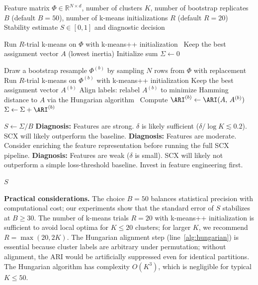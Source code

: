 \begin{algorithm}[t]
\caption{Bootstrap ARI Stability Diagnostic for Feature Strength}
\label{alg:bootstrap_stability}
\begin{algorithmic}[1]
\Require Feature matrix $\Phi \in \mathbb{R}^{N \times d}$, number of clusters $K$, number of bootstrap replicates $B$ (default $B = 50$), number of k-means initializations $R$ (default $R = 20$)
\Ensure Stability estimate $S \in [0, 1]$ and diagnostic decision

\State Run $R$-trial k-means on $\Phi$ with k-means++ initialization~\cite{arthur2007kmeans}
\State Keep the best assignment vector $A$ (lowest inertia) \label{alg:full_assign}
\State Initialize sum $\Sigma \gets 0$

    \State Draw a bootstrap resample $\Phi^{(b)}$ by sampling $N$ rows from $\Phi$ with replacement \label{alg:bootstrap}
    \State Run $R$-trial k-means on $\Phi^{(b)}$ with k-means++ initialization
    \State Keep the best assignment vector $A^{(b)}$
    \State Align labels: relabel $A^{(b)}$ to minimize Hamming distance to $A$ via the Hungarian algorithm~\cite{kuhn1955hungarian} \label{alg:hungarian}
    \State Compute $\ARI^{(b)} \gets \ARI(A,\, A^{(b)})$ \label{alg:ari}
    \State $\Sigma \gets \Sigma + \ARI^{(b)}$
\EndFor

\State $S \gets \Sigma / B$
    \State \textbf{Diagnosis:} Features are strong. $\delta$ is likely sufficient ($\delta / \log K \lesssim 0.2$). SCX will likely outperform the baseline. \label{alg:strong}
    \State \textbf{Diagnosis:} Features are moderate. Consider enriching the feature representation before running the full SCX pipeline. \label{alg:moderate}
\Else
    \State \textbf{Diagnosis:} Features are weak ($\delta$ is small). SCX will likely not outperform a simple loss-threshold baseline. Invest in feature engineering first. \label{alg:weak}
\EndIf

\State \Return $S$
\end{algorithmic}
\end{algorithm}

\textbf{Practical considerations.} The choice $B = 50$ balances statistical precision with computational cost; our experiments show that the standard error of $S$ stabilizes at $B \geq 30$. The number of k-means trials $R = 20$ with k-means++ initialization is sufficient to avoid local optima for $K \leq 20$ clusters; for larger $K$, we recommend $R = \max(20, 2K)$. The Hungarian alignment step (line~\ref{alg:hungarian}) is essential because cluster labels are arbitrary under permutation; without alignment, the ARI would be artificially suppressed even for identical partitions. The Hungarian algorithm has complexity $O(K^3)$, which is negligible for typical $K \leq 50$.

